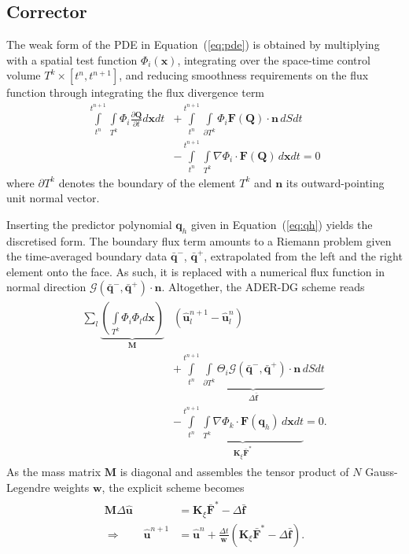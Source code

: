\documentclass{acm_proc_article-sp}
\begin{document}
\subsection{Corrector}\label{sec2:2}

The weak form of the PDE in Equation~(\ref{eq:pde}) is obtained by 
multiplying with a spatial test function $\Phi_i(\mathbf{x})$, integrating over the space-time control volume \mbox{$T^k \times [t^n, t^{n+1}]$}, and reducing smoothness requirements on the flux function through integrating the flux divergence term
\begin{align*}
\int \limits_{t^n}^{t^{n+1}} \int \limits_{T^k} \Phi_i \frac{\partial \mathbf{Q}}{\partial t} d\textbf{x}dt &+  \int \limits_{t^n}^{t^{n+1}} \int \limits_{\partial T^k} \Phi_i \mathbf{F}(\mathbf{Q})\cdot \mathbf{n} \, dS dt \\ &- \int \limits_{t^n}^{t^{n+1}} \int \limits_{T^k}\nabla \Phi_i \cdot \mathbf{F}(\mathbf{Q}) \, d\mathbf{x}dt = 0
\end{align*}
where $\partial T^k$ denotes the boundary of the element $T^k$ and $\mathbf{n}$ its outward-pointing unit normal vector.

Inserting the predictor polynomial $\mathbf{q}_h$ given in Equation~(\ref{eq:qh}) yields the discretised form. The boundary flux term amounts to a Riemann problem given the time-averaged boundary data $\bar{\mathbf{q}}^-$, $\bar{\mathbf{q}}^+$, extrapolated from the left and the right element onto the face. As such, it is replaced with a numerical flux function in normal direction $\mathcal{G}(\bar{\mathbf{q}}^-,\bar{\mathbf{q}}^+)\cdot \mathbf{n}$. Altogether, the ADER-DG scheme reads
\begin{align}\label{eq:corrector2}
\begin{split}
\sum \limits_l \underbrace{\left(\int \limits_{T^k} \Phi_i \Phi_l d\mathbf{x} \right)}_{\mathbf{M}} &\left(\hat{\mathbf{u}}_l^{n+1} - \hat{\mathbf{u}}_l^{n} \right) \\
&+ \underbrace{\int \limits_{t^n}^{t^{n+1}} \int \limits_{\partial T^k} \Theta_i \mathcal{G}(\bar{\mathbf{q}}^-,\bar{\mathbf{q}}^+)\cdot \mathbf{n} \, dS dt}_{\Delta \bar{\mathbf{f}}} \\
&- \underbrace{\int \limits_{t^n}^{t^{n+1}} \int \limits_{T^k} \nabla \Phi_k \cdot \mathbf{F}(\mathbf{q}_h) \, d\mathbf{x} dt}_{\mathbf{K}_\xi \bar{\mathbf{F}}^*} = 0.
\end{split}
\end{align} 
As the mass matrix $\mathbf{M}$ is diagonal and assembles the tensor product of $N$ Gauss-Legendre weights $\mathbf{w}$, the explicit scheme becomes
\begin{align}
\begin{split}
\label{eq:predictorscheme}
\mathbf{M}\Delta \hat{\mathbf{u}} &= \mathbf{K}_\xi \bar{\mathbf{F}}^* - \Delta \bar{\mathbf{f}} \\
\Rightarrow \qquad \hat{\mathbf{u}}^{n+1} &=  \hat{\mathbf{u}}^n + \frac{\Delta t}{\mathbf{w}} \left(\mathbf{K}_\xi \bar{\mathbf{F}}^* - \Delta \bar{\mathbf{f}} \right).
\end{split}
\end{align}
\end{document}
